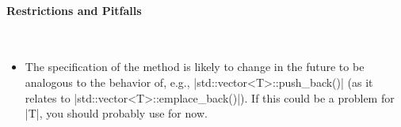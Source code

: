 \paragraph{Restrictions and Pitfalls}\mbox{}\\
\begin{itemize}
  \item The specification of the method is likely to change in the future to
  be analogous to the behavior of, e.g., |std::vector<T>::push_back()| (as it
  relates to |std::vector<T>::emplace_back()|).  If this could be a
  problem for |T|, you should probably use  for now.
\end{itemize}




